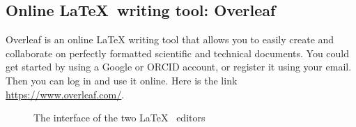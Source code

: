 \documentclass[12pt]{article}  %
\begin{document}
 \subsection{Online \LaTeX ~writing tool: Overleaf}
 
 Overleaf is an online LaTeX writing tool that allows you to easily create and collaborate on perfectly formatted scientific and technical documents. You could get started by using a Google or ORCID account, or register it using your email. Then you can log in and use it online. Here is the link \href{https://www.overleaf.com/}{\underline{https://www.overleaf.com/}}.
 
 \begin{figure}[htbp]  %
 \centering
 \centering
 \caption{The interface of the two \LaTeX ~ editors }
 \vspace{-0.2cm}
 \label{fig4}
 \end{figure}
 
\end{document}
